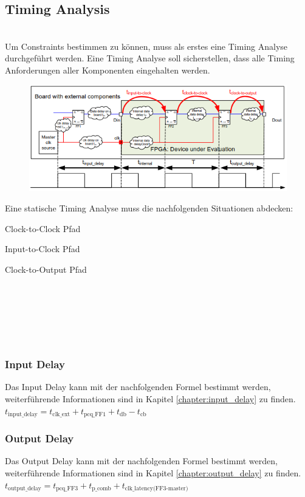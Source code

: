 \subsection{Timing Analysis}$~$ \\
Um Constraints bestimmen zu können, muss als erstes eine Timing Analyse durchgeführt werden. Eine Timing Analyse soll sicherstellen, dass alle Timing Anforderungen aller Komponenten eingehalten werden. \\
\begin{minipage}{0.65\textwidth}
    \begin{figure}[H]
        \includegraphics[width=\textwidth]{images/static_timing_analysis.png}
    \end{figure}
\end{minipage}
\hfill
\begin{minipage}{0.3\textwidth}
    Eine statische Timing Analyse muss die nachfolgenden Situationen abdecken:
    \begin{compactitem}
        \item Clock-to-Clock Pfad
        \item Input-to-Clock Pfad
        \item Clock-to-Output Pfad
    \end{compactitem}
    \ \\ \ \\ \ \\ \ \\ \ \\
\end{minipage}
\hspace*{+1cm}
\begin{multicols}{2}
    \subsubsection{Input Delay}
    Das Input Delay kann mit der nachfolgenden Formel bestimmt werden, weiterführende Informationen sind in Kapitel \ref{chapter:input_delay} zu finden. \\
    $t_{\text{input\_delay}}=t_{\text{clk\_ext}}+t_{\text{pcq\_FF1}}+t_{\text{db}}-t_{\text{cb}}$

    \subsubsection{Output Delay}
    Das Output Delay kann mit der nachfolgenden Formel bestimmt werden, weiterführende Informationen sind in Kapitel \ref{chapter:output_delay} zu finden. \\
    $t_{\text{output\_delay}}=t_{\text{pcq\_FF3}}+t_{\text{p\_comb}}+t_{\text{clk\_latency(FF3-master)}}$
\end{multicols}

